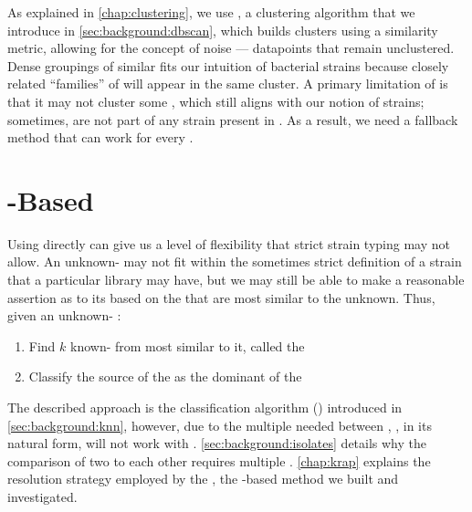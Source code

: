 As explained in \autoref{chap:clustering}, we use \dbscan{}, a \dbased{} clustering algorithm that we introduce in \autoref{sec:background:dbscan}, which builds clusters using a similarity metric, allowing for the concept of noise --- datapoints that remain unclustered.
Dense groupings of similar \isols{} fits our intuition of bacterial \isol{} strains because closely related ``families'' of \isols{} will appear in the same cluster.
A primary limitation of \dbscan{} is that it may not cluster some \isols{}, which still aligns with our notion of strains; sometimes, \isols{} are not part of any strain present in \cplop{}.
As a result, we need a fallback \mst{} method that can work for every \isol{}.

\section{\Isol{}-Based}
Using \isols{} directly can give us a level of flexibility that strict strain typing may not allow.
An unknown-\spec{} may not fit within the sometimes strict definition of a strain that a particular library may have, but we may still be able to make a reasonable assertion as to its \spec{} based on the \isols{} that are most similar to the unknown.
Thus, given an unknown-\spec{} \isol{}: 
\begin{enumerate}
    \item Find $k$ known-\spec{} \isols{} from \cplop{} most similar to it, called the \knnlong{}
    \item Classify the source \spec{} of the \isol{} as the dominant \spec{} of the \knnlong{}
\end{enumerate}

The described approach is the \kNNlong{} classification algorithm (\kNN{}) introduced in \autoref{sec:background:knn}, however, due to the multiple \compfuncs{} needed between \isols{}, \kNN{}, in its natural form, will not work with \cplop{}.
\autoref{sec:background:isolates} details why the comparison of two \isols{} to each other requires multiple \compfuncs{}.
\autoref{chap:krap} explains the \compfunc{} resolution strategy employed by the \kraplong{}, the \isol{}-based \mst{} method we built and investigated.